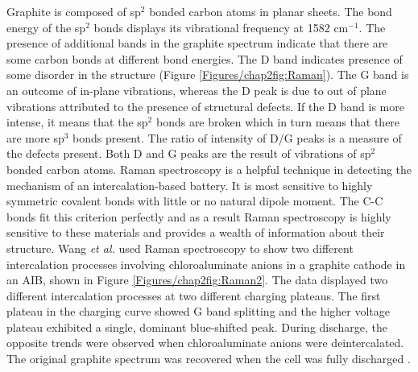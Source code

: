 Graphite is composed of sp$^2$ bonded carbon atoms in planar sheets. The bond energy of the sp$^2$ bonds displays its vibrational frequency at 1582 cm$^{-1}$. The presence of additional bands in the graphite spectrum indicate that there are some carbon bonds at different bond energies. The D band indicates presence of some disorder in the structure (Figure \ref{Figures/chap2fig:Raman}). The G band is an outcome of in-plane vibrations, whereas the D peak is due to out of plane vibrations attributed to the presence of structural defects. If the D band is more intense, it means that the sp$^2$ bonds are broken which in turn means that there are more sp$^3$ bonds present. The ratio of intensity of D/G peaks is a measure of the defects present. Both D and G peaks are the result of vibrations of sp$^2$ bonded carbon atoms.  
Raman spectroscopy is a helpful technique in detecting the mechanism of an intercalation-based battery. It is most sensitive to highly symmetric covalent bonds with little or no natural dipole moment. The C-C bonds fit this criterion perfectly and as a result Raman spectroscopy is highly sensitive to these materials and provides a wealth of information about their structure. Wang \textit{et al.} used Raman spectroscopy to show two different intercalation processes involving chloroaluminate anions in a graphite cathode in an AIB, shown in Figure \ref{Figures/chap2fig:Raman2}. The data displayed two different intercalation processes at two different charging plateaus. The first plateau in the charging curve showed G band splitting and the higher voltage plateau exhibited a single, dominant blue-shifted peak. During discharge, the opposite trends were observed when chloroaluminate anions were deintercalated. The original graphite spectrum was recovered when the cell was fully discharged \cite{wang_advanced_2017}. 

